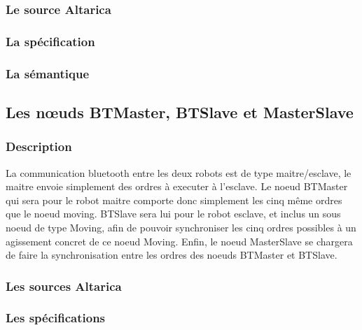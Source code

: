    \subsubsection{Le source Altarica}
   
   
   \subsubsection{La spécification}
   
 
   \subsubsection{La sémantique}

  \subsection{Les n\oe{}uds BTMaster, BTSlave et MasterSlave}
  
   \subsubsection{Description}
   La communication bluetooth entre les deux robots est de type
   maitre/esclave, le maitre envoie simplement des ordres à executer à
   l'esclave. Le noeud BTMaster qui sera pour le robot maitre comporte
   donc simplement les cinq même ordres que le noeud moving. BTSlave
   sera lui pour le robot esclave, et inclus un sous noeud de type
   Moving, afin de pouvoir synchroniser les cinq ordres possibles à un
   agissement concret de ce noeud Moving. Enfin, le noeud MasterSlave se
   chargera de faire la synchronisation entre les ordres des noeuds
   BTMaster et BTSlave.

   \subsubsection{Les sources Altarica}
   
   
   
   
   \subsubsection{Les spécifications}
   
   
   

